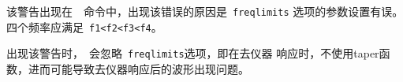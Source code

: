 该警告出现在~~命令中，出现该错误的原因是~\verb+freqlimits+
选项的参数设置有误。四个频率应满足~\verb+f1<f2<f3<f4+。

出现该警告时，~会忽略~\verb+freqlimits+选项，即在去仪器
响应时，不使用taper函数，进而可能导致去仪器响应后的波形出现问题。
